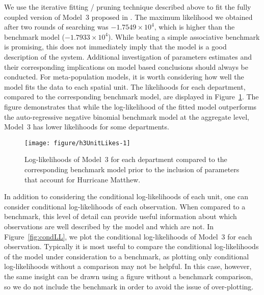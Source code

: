 We use the iterative fitting / pruning technique described above to fit the fully coupled version of Model~3 proposed in \cite{lee20}.
The maximum likelihood we obtained after two rounds of searching was $\ensuremath{-1.7549\times 10^{4}}$, which is higher than the benchmark model ($\ensuremath{-1.7933\times 10^{4}}$).
While beating a simple associative benchmark is promising, this does not immediately imply that the model is a good description of the system.
Additional investigation of parameters estimates and their corresponding implications on model based conclusions should always be conducted.
For meta-population models, it is worth considering how well the model fits the data to each spatial unit.
The likelihoods for each department, compared to the corresponding benchmark model, are displayed in Figure~\ref{fig:h3UnitLikes}.
The figure demonstrates that while the log-likelihood of the fitted model outperforms the auto-regressive negative binomial benchmark model at the aggregate level, Model~3 has lower likelihoods for some departments.

\begin{figure}[!ht]
\begin{knitrout}
\color{fgcolor}

{\centering \texttt{[image: figure/h3UnitLikes-1]} 

}


\end{knitrout}
\caption[Model~3 unit log-likelihoods.]{\label{fig:h3UnitLikes}Log-likelihoods of Model~3 for each department compared to the corresponding benchmark model prior to the inclusion of parameters that account for Hurricane Matthew.}
\end{figure}

In addition to considering the conditional log-likelihoods of each unit, one can consider conditional log-likelihoods of each observation.
When compared to a benchmark, this level of detail can provide useful information about which observations are well described by the model and which are not.
In Figure~\ref{fig:condLL}, we plot the conditional log-likelihoods of Model~3 for each observation.
Typically it is most useful to compare the conditional log-likelihoods of the model under consideration to a benchmark, as plotting only conditional log-likelihoods without a comparison may not be helpful.
In this case, however, the same insight can be drawn using a figure without a benchmark comparison, so we do not include the benchmark in order to avoid the issue of over-plotting.

